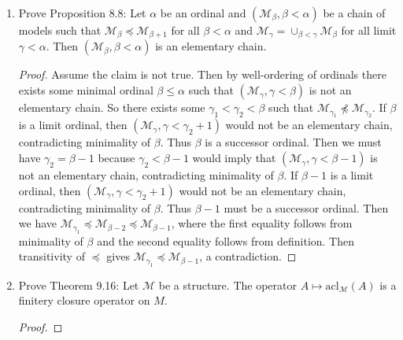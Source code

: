 \documentclass{article}
\begin{document}
\begin{enumerate}[label={\bf Q\arabic*:}]
  \item Prove Proposition 8.8: Let $\alpha$ be an ordinal and
    $(\mathcal{M}_\beta,\beta<\alpha)$ be a chain of models such that
    $\mathcal{M}_\beta\preceq\mathcal{M}_{\beta+1}$ for all $\beta<\alpha$
    and $\mathcal{M}_\gamma=\cup_{\beta<\gamma}\mathcal{M}_\beta$ for all
    limit $\gamma<\alpha$. Then $(\mathcal{M}_\beta,\beta<\alpha)$ is an
    elementary chain.

    \begin{proof}
      Assume the claim is not true. Then by well-ordering of ordinals there
      exists some minimal ordinal $\beta\leq\alpha$ such that
      $(\mathcal{M}_\gamma,\gamma<\beta)$ is not an elementary chain. So
      there exists some $\gamma_1<\gamma_2<\beta$ such that
      $\mathcal{M}_{\gamma_1}\not\preceq\mathcal{M}_{\gamma_2}$. If $\beta$
      is a limit ordinal, then $(\mathcal{M}_\gamma,\gamma<\gamma_2+1)$
      would not be an elementary chain, contradicting minimality of
      $\beta$. Thus $\beta$ is a successor ordinal. Then we must have
      $\gamma_2=\beta-1$ because $\gamma_2<\beta-1$ would imply that
      $(\mathcal{M}_\gamma,\gamma<\beta-1)$ is not an elementary chain,
      contradicting minimality of $\beta$. If $\beta-1$ is a limit ordinal,
      then $(\mathcal{M}_\gamma,\gamma<\gamma_2+1)$ would not be an
      elementary chain, contradicting minimality of $\beta$. Thus $\beta-1$
      must be a successor ordinal. Then we have $\mathcal{M}_{\gamma_1}
      \preceq\mathcal{M}_{\beta-2} \preceq\mathcal{M}_{\beta-1}$, where the
      first equality follows from minimality of $\beta$ and the second
      equality follows from definition. Then transitivity of $\preceq$
      gives $\mathcal{M}_{\gamma_1}\preceq\mathcal{M}_{\beta-1}$, a
      contradiction.
    \end{proof}

  \item Prove Theorem 9.16: Let $\mathcal{M}$ be a structure. The operator
    $A\mapsto\text{acl}_\mathcal{M}(A)$ is a finitery closure operator on
    $M$.

    \begin{proof}
    \end{proof}
\end{enumerate}
\end{document}
